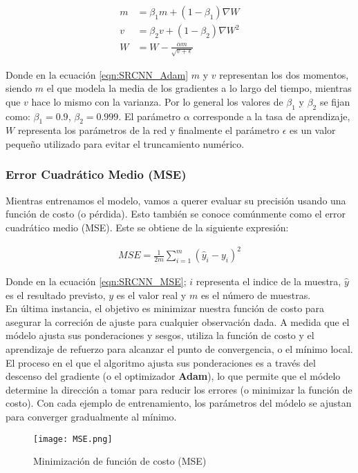 \begin{equation}
    \label{eqn:SRCNN_Adam}
    \begin{split}
        m&=\beta_1m+(1-\beta_1)\nabla W\\
        v&=\beta_2v+(1-\beta_2)\nabla W^2\\
        W&=W-\frac{\alpha m}{\sqrt{v+\epsilon}}
    \end{split}
\end{equation}

Donde en la ecuación \eqref{eqn:SRCNN_Adam} $m$ y $v$ representan los dos momentos, siendo $m$ el que modela la media de los
gradientes a lo largo del tiempo, mientras que $v$ hace lo mismo con la varianza. Por lo general los valores de $\beta_1$ y
$\beta_2$ se fijan como: $\beta_1=0.9$, $\beta_2=0.999$. El parámetro $\alpha$ corresponde a la tasa de aprendizaje, $W$
representa los parámetros de la red y finalmente el parámetro $\epsilon$ es un valor pequeño utilizado para evitar el
truncamiento numérico.

\subsubsection{Error Cuadrático Medio (MSE)}
Mientras entrenamos el modelo, vamos a querer evaluar su precisión usando una función de costo (o pérdida). Esto también
se conoce comúnmente como el error cuadrático medio (MSE). Este se obtiene de la siguiente expresión:

\begin{align}
    \label{eqn:SRCNN_MSE}
    MSE=\frac{1}{2m}\sum_{i=1}^{m}(\hat{y}_i-y_i)^2
\end{align}

Donde en la ecuación \eqref{eqn:SRCNN_MSE}; $i$ representa el indice de la muestra, $\hat{y}$ es el resultado previsto,
$y$ es el valor real y  $m$ es el número de muestras.\\
En última instancia, el objetivo es minimizar nuestra función de costo para asegurar la correción de ajuste para cualquier
observación dada. A medida que el módelo ajusta sus ponderaciones y sesgos, utiliza la función de costo  y el aprendizaje
de refuerzo para alcanzar el punto de convergencia, o el mínimo local. El proceso en el que el algoritmo ajusta sus
ponderaciones es a través del descenso del gradiente (o el optimizador \textbf{Adam}), lo que permite que el módelo
determine la dirección a tomar para reducir los errores (o minimizar la función de costo). Con cada ejemplo de entrenamiento,
los parámetros del módelo se ajustan para converger gradualmente al mínimo.

\begin{figure}[H]
    \label{fig:SRCNN_MSE}
    \centering
    \texttt{[image: MSE.png]}
    \caption{Minimización de función de costo (MSE)}
\end{figure}